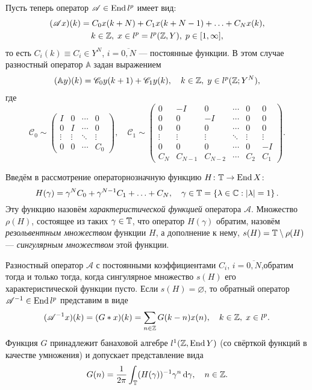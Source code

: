 Пусть теперь оператор $\mathcal A \in \operatorname{End}{l^p}$ имеет вид:
\begin{gather*}
    (\mathcal A x)(k) = C_0 x(k + N) + C_1 x(k + N - 1) + \dotsc + C_N x(k), \\
    k \in \mathbb{Z}, \; x \in l^p = l^p(\mathbb{Z}, Y), \; p \in [1, \infty],
\end{gather*}
то есть $C_i(k) \equiv C_i \in Y^N$, $i = \overline{0,N}$ --- постоянные функции. В этом случае разностный оператор $\mathbb A$ задан выражением
\begin{align*}
    (\mathbb A y)(k) = \mathcal C_0 y(k + 1) + \mathcal C_1 y(k), \quad k \in \mathbb{Z}, \; y \in l^p(\mathbb{Z}; Y^N),
\end{align*}
где
\[
    \mathcal C_0 \sim \begin{pmatrix}
    I & 0 & \cdots &  0 \\
    0 & I  & \cdots &  0 \\
    \vdots & \vdots & \ddots &  \vdots \\
    0 & 0 & \cdots &  C_0
   \end{pmatrix},\quad
   \mathcal C_1 \sim \begin{pmatrix}
    0 & -I & 0  & \cdots & 0 & 0 \\
    0 & 0  & -I & \cdots & 0 & 0 \\
    0 & 0  & 0 & \cdots & 0 & 0 \\
    \vdots & \vdots & \vdots & \ddots & \vdots & \vdots \\
    0 & 0 & 0 & \cdots & 0 & -I \\
    C_N & C_{N-1} & C_{N-2} & \cdots & C_2 & C_1
   \end{pmatrix}.
\]

Введём в рассмотрение операторнозначную функцию $H \colon \mathbb{T} \to \operatorname{End} X$:
\[ H(\gamma) = \gamma^N C_0 + \gamma^{N-1} C_1 + \dotsc + C_N, \quad \gamma \in \mathbb{T} = \left\{\lambda \in \mathbb{C} : \left|\lambda\right| = 1\right\}. \]
Эту функцию назовём \emph{характеристической функцией} оператора $ \mathcal A$. Множество $\rho(H)$, состоящее из таких $\gamma \in \mathbb{T}$, что оператор $H(\gamma)$ обратим, назовём \emph{резольвентным множеством} функции $H$, а дополнение к нему, $s(H) = \mathbb{T} \setminus \rho(H)$ --- \emph{сингулярным множеством} этой функции.

\begin{theorem}
    Разностный оператор $\mathcal A$ с постоянными коэффициентами $C_i$, $i = \overline{0,N}$,обратим тогда и только тогда, когда сингулярное множество $s(H)$ его характеристической функции пусто. Если $s(H) = \varnothing$, то обратный оператор $\mathcal A^{-1} \in \operatorname{End} l^p$ представим в виде
    \begin{equation}\label{eq:invconst}
     (\mathcal A^{-1} x)(k) = (G * x)(k)= \sum_{n \in \mathbb{Z}} G(k - n) x(n), \quad k \in \mathbb{Z}, \; x \in l^p.
    \end{equation}
    Функция $G$ принадлежит банаховой алгебре $l^1(\mathbb{Z}, \operatorname{End} Y)$ (со свёрткой функций в качестве умножения) и допускает представление вида
    \[ G(n) = \frac{1}{2 \pi} \int_{\mathbb{T}} (H(\gamma))^{-1} \gamma^n \,\mathrm{d} \gamma, \quad n \in \mathbb{Z}. \]
\end{theorem}

